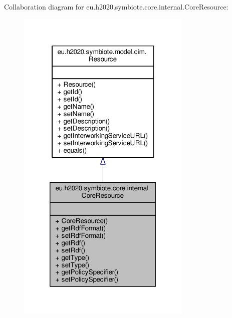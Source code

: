 Collaboration diagram for eu.\+h2020.\+symbiote.\+core.\+internal.\+Core\+Resource\+:\nopagebreak
\begin{figure}[H]
\begin{center}
\leavevmode
\includegraphics[width=236pt]{classeu_1_1h2020_1_1symbiote_1_1core_1_1internal_1_1CoreResource__coll__graph}
\end{center}
\end{figure}
